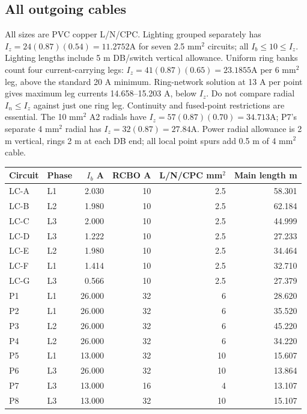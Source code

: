 \documentclass[11pt]{article}
\begin{document}
\subsection*{All outgoing cables}
All sizes are PVC copper L/N/CPC. Lighting grouped separately has $I_z=24(0.87)(0.54)=11.2752$A for seven 2.5 mm$^2$ circuits;  all $I_b\le 10\le I_z$. Lighting lengths include 5 m DB/switch vertical allowance.
Uniform ring banks count four current-carrying legs: $I_z=41(0.87)(0.65)=23.1855$A per 6 mm$^2$ leg, above the standard 20 A minimum. Ring-network solution at 13 A per point gives maximum leg currents 14.658--15.203 A, below $I_z$. Do not compare radial $I_n\le I_z$ against just one ring leg. Continuity and fused-point restrictions are essential.
The 10 mm$^2$ A2 radials have $I_z=57(0.87)(0.70)=34.713$A;  P7's separate 4 mm$^2$ radial has $I_z=32(0.87)=27.84$A. Power radial allowance is 2 m vertical, rings 2 m at each DB end;  all local point spurs add 0.5 m of 4 mm$^2$ cable.
\begin{longtable}{llrrrr}\toprule
Circuit & Phase & $I_b$ A & RCBO A & L/N/CPC mm$^2$ & Main length m\\\midrule\endhead

LC-A & L1 & 2.030 & 10 & 2.5 & 58.301 \\
LC-B & L2 & 1.980 & 10 & 2.5 & 62.184 \\
LC-C & L3 & 2.000 & 10 & 2.5 & 44.999 \\
LC-D & L3 & 1.222 & 10 & 2.5 & 27.233 \\
LC-E & L2 & 1.980 & 10 & 2.5 & 34.464 \\
LC-F & L1 & 1.414 & 10 & 2.5 & 32.710 \\
LC-G & L3 & 0.566 & 10 & 2.5 & 27.379 \\
P1 & L1 & 26.000 & 32 & 6 & 28.620 \\
P2 & L1 & 26.000 & 32 & 6 & 35.520 \\
P3 & L2 & 26.000 & 32 & 6 & 45.220 \\
P4 & L2 & 26.000 & 32 & 6 & 34.220 \\
P5 & L1 & 13.000 & 32 & 10 & 15.607 \\
P6 & L3 & 26.000 & 32 & 10 & 13.864 \\
P7 & L3 & 13.000 & 16 & 4 & 13.107 \\
P8 & L3 & 13.000 & 32 & 10 & 15.107 \\

\bottomrule\end{longtable}
\end{document}
